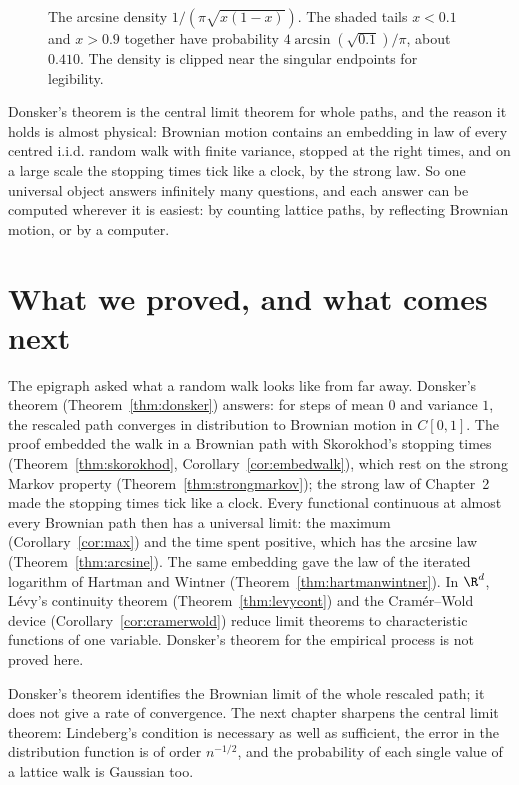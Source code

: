 \begin{figure}[ht]
\centering{}
\caption{The arcsine density $1/(\pi\sqrt{x(1-x)})$. The shaded tails $x<0.1$ and $x>0.9$ together have probability $4\arcsin(\sqrt{0.1})/\pi$, about $0.410$. The density is clipped near the singular endpoints for legibility.}
\label{fig:v11-ch03-arcsine-density}
\end{figure}

\begin{beauty}
Donsker's theorem is the central limit theorem for whole paths, and the reason it holds is almost physical: Brownian motion contains an embedding in law of every centred i.i.d. random walk with finite variance,
stopped at the right times, and on a large scale the stopping times tick like a clock, by the strong law. So one universal object answers infinitely many questions, and each
answer can be computed wherever it is easiest: by counting lattice paths, by reflecting Brownian motion, or by a computer.
\end{beauty}

\section{What we proved, and what comes next}

The epigraph asked what a random walk looks like from far away. Donsker's theorem (Theorem~\ref{thm:donsker}) answers: for steps of mean $0$ and
variance $1$, the rescaled path converges in distribution to Brownian motion in $C[0,1]$. The proof embedded the walk in a Brownian path with
Skorokhod's stopping times (Theorem~\ref{thm:skorokhod}, Corollary~\ref{cor:embedwalk}), which rest on the strong Markov property
(Theorem~\ref{thm:strongmarkov}); the strong law of Chapter~2 made the stopping times tick like a clock. Every functional continuous at almost every
Brownian path then has a universal limit: the maximum (Corollary~\ref{cor:max}) and the time spent positive, which has the arcsine law
(Theorem~\ref{thm:arcsine}). The same embedding gave the law of the iterated logarithm of Hartman and Wintner (Theorem~\ref{thm:hartmanwintner}).
In $\R^d$, L\'evy's continuity theorem (Theorem~\ref{thm:levycont}) and the Cram\'er--Wold device (Corollary~\ref{cor:cramerwold}) reduce limit
theorems to characteristic functions of one variable. Donsker's theorem for the empirical process is not proved here.

Donsker's theorem identifies the Brownian limit of the whole rescaled path; it does not give a rate of convergence. The next chapter sharpens the
central limit theorem: Lindeberg's condition is necessary as well as sufficient, the error in the distribution function is of order $n^{-1/2}$,
and the probability of each single value of a lattice walk is Gaussian too.

